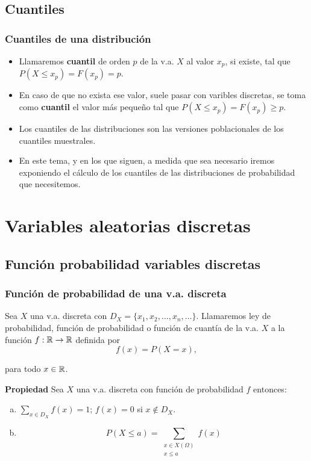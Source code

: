 \subsection{Cuantiles}
\begin{frame}
\frametitle{Cuantiles de una distribución}
\begin{itemize}
\item Llamaremos \textbf{cuantil} de orden $p$ de la v.a. $X$ al valor $x_p$, si existe, tal que $P(X\leq x_p)=F(x_p)=p$.
\item En caso de que no exista ese valor, suele pasar con varibles discretas, se toma como \textbf{cuantil} el valor más pequeño tal que $P(X\leq x_p)=F(x_p)\geq p$.
\item Los cuantiles de las distribuciones son las versiones poblacionales de los cuantiles muestrales.
\item En este tema, y en los que siguen, a medida que sea necesario iremos exponiendo el cálculo de los cuantiles de las distribuciones de probabilidad que necesitemos.
\end{itemize}
\end{frame}
\section{Variables aleatorias discretas}
\subsection{Función probabilidad variables discretas}
\begin{frame}

    \frametitle{Función de probabilidad de una v.a. discreta}

    Sea $X$ una v.a. discreta con
    $D_X=\{x_{1},x_{2},\ldots,x_{n},\ldots\}$. Llamaremos ley
    de probabilidad, funci\'on de probabilidad o función de cuantía de la v.a. $X$ a la
    funci\'on $f:\mathbb{R}\to\mathbb{R}$ definida por 
$$f(x)=P(X=x),$$ 

para todo
    $x\in\mathbb{R}$.
% 
\end{frame}



\begin{frame}
     \textbf{Propiedad}
     Sea $X$ una v.a. discreta con funci\'on de probabilidad $f$
     entonces:
     \begin{enumerate}[a)]
         \item $\displaystyle \sum_{x\in D_X} f(x)=1$; $f(x)=0$ si
         $x\not\in D_X$.
         \item $$P(X\leq a)=\sum_{\begin{array}{c}x\in
         X(\Omega)\\ x\leq a\end{array}} f(x)$$

         \end{enumerate}
          \end{frame}

